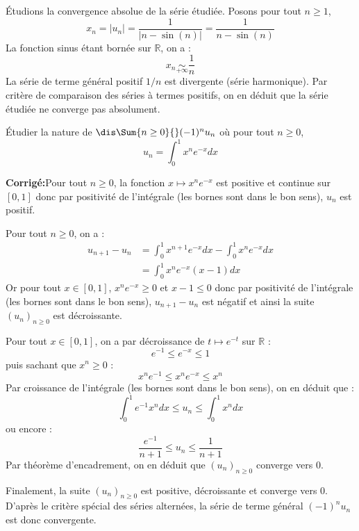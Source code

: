 \documentclass[a4paper,twoside,french,10pt]{VcCours}
\newcommand{\corr}{\textbf{Corrigé:}}
\begin{document}
\medskip

\noindent Étudions la convergence absolue de la série étudiée. Posons pour tout $n \geq 1$,
$$ x_n = \vert u_n \vert = \dfrac{1}{\vert n - \sin(n) \vert} = \dfrac{1}{n- \sin(n)}$$
La fonction sinus étant bornée sur $\mathbb{R}$, on a :
$$ x_n \underset{+ \infty}{\sim} \dfrac{1}{n}$$
La série de terme général positif $1/n$ est divergente (série harmonique). Par critère de comparaison des séries à termes positifs, on en déduit que la série étudiée ne converge pas absolument.

\medskip

\begin{Exercice}{} Étudier la nature de $\dis \Sum{n \geq 0}{} (-1)^n u_n$ où pour tout $n \geq 0$,
\vspace{-0.4cm}
$$ u_n = \int_{0}^1 x^n e^{-x} dx$$
\end{Exercice}

\corr Pour tout $n \geq 0$, la fonction $x \mapsto x^n e^{-x}$ est positive et continue sur $[0,1]$ donc par positivité de l'intégrale (les bornes sont dans le bon sens), $u_n$ est positif.

\medskip

\noindent Pour tout $n \geq 0$, on a :
\begin{align*}
u_{n+1}-u_n & = \int_{0}^1 x^{n+1} e^{-x} dx - \int_{0}^1 x^{n} e^{-x} dx \\
& =\int_{0}^1 x^n e^{-x} (x-1) dx
\end{align*}
Or pour tout $x \in [0,1]$, $x^n e^{-x} \geq 0$ et $x-1 \leq 0$ donc par positivité de l'intégrale (les bornes sont dans le bon sens), $u_{n+1}-u_n$ est négatif et ainsi la suite $(u_n)_{n \geq 0}$ est décroissante.

\medskip

\noindent Pour tout $x \in [0,1]$, on a par décroissance de $t \mapsto e^{-t}$ sur $\mathbb{R}$ :
$$e^{-1} \leq e^{-x} \leq 1$$
puis sachant que $x^n \geq 0$ :
$$ x^n e^{-1} \leq x^n e^{-x} \leq x^n $$
Par croissance de l'intégrale (les bornes sont dans le bon sens), on en déduit que :
$$ \int_{0}^1 e^{-1}x^n dx \leq u_n \leq \int_{0}^1 x^n dx$$
ou encore :
$$ \frac{e^{-1}}{n+1} \leq u_n \leq \frac{1}{n+1}$$
Par théorème d'encadrement, on en déduit que $(u_n)_{n \geq 0}$ converge vers $0$.

\medskip

\noindent Finalement, la suite $(u_n)_{n \geq 0}$ est positive, décroissante et converge vers $0$. D'après le critère spécial des séries alternées, la série de terme général $(-1)^n u_n$ est donc convergente. 
\end{document}
